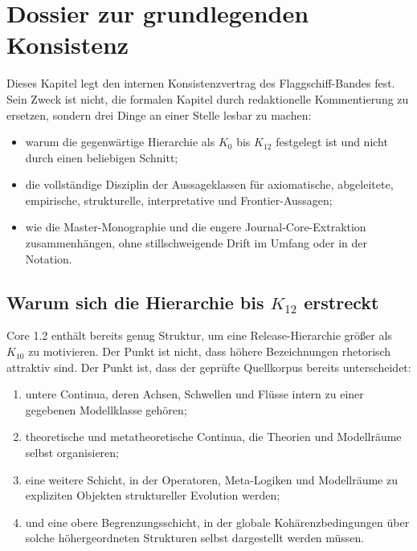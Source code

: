\section{Dossier zur grundlegenden Konsistenz}
\label{sec:oc13-foundational-consistency}

Dieses Kapitel legt den internen Konsistenzvertrag des Flaggschiff-Bandes fest.
Sein Zweck ist nicht, die formalen Kapitel durch redaktionelle Kommentierung zu
ersetzen, sondern drei Dinge an einer Stelle lesbar zu machen:

\begin{itemize}
\item warum die gegenwärtige Hierarchie als \(K_0\) bis \(K_{12}\) festgelegt
      ist und nicht durch einen beliebigen Schnitt;
\item die vollständige Disziplin der Aussageklassen für axiomatische,
      abgeleitete, empirische, strukturelle, interpretative und Frontier-Aussagen;
\item wie die Master-Monographie und die engere Journal-Core-Extraktion
      zusammenhängen, ohne stillschweigende Drift im Umfang oder in der Notation.
\end{itemize}

\subsection{Warum sich die Hierarchie bis \texorpdfstring{$K_{12}$}{K12} erstreckt}

Core 1.2 enthält bereits genug Struktur, um eine Release-Hierarchie größer als
\(K_{10}\) zu motivieren. Der Punkt ist nicht, dass höhere Bezeichnungen
rhetorisch attraktiv sind. Der Punkt ist, dass der geprüfte Quellkorpus bereits
unterscheidet:

\begin{enumerate}
\item untere Continua, deren Achsen, Schwellen und Flüsse intern zu einer
      gegebenen Modellklasse gehören;
\item theoretische und metatheoretische Continua, die Theorien und
      Modellräume selbst organisieren;
\item eine weitere Schicht, in der Operatoren, Meta-Logiken und Modellräume
      zu expliziten Objekten struktureller Evolution werden;
\item und eine obere Begrenzungsschicht, in der globale Kohärenzbedingungen
      über solche höhergeordneten Strukturen selbst dargestellt werden müssen.
\end{enumerate}


